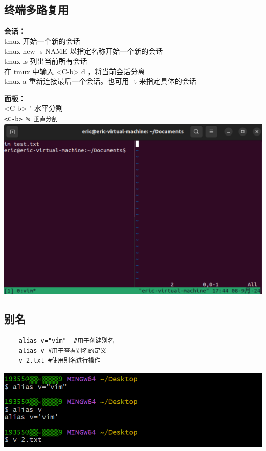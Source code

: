 \documentclass[UTF8,a4paper]{ctexart}
\begin{document}
\subsection{终端多路复用}
\textbf{会话：}\\
tmux 开始一个新的会话\\
tmux new -s NAME 以指定名称开始一个新的会话\\
tmux ls 列出当前所有会话\\
在 tmux 中输入 <C-b> d ，将当前会话分离\\
tmux a 重新连接最后一个会话。也可用 -t 来指定具体的会话\par
\textbf{面板：}\\
<C-b> " 水平分割\\
\verb|<C-b> % 垂直分割|\\
\includegraphics[width=1\textwidth]{./命令行/终端多路复用.png}

\subsection{别名}
\begin{lstlisting}
    alias v="vim"  #用于创建别名
    alias v #用于查看别名的定义
    v 2.txt #使用别名进行操作
    \end{lstlisting}
\includegraphics[width=1\textwidth]{./命令行/别名.png}
\end{document}
